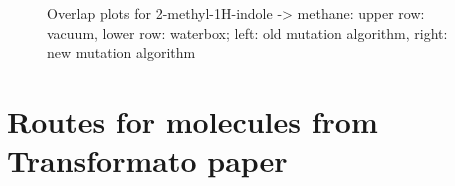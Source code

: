 \begin{figure}[h]
	\hfil
	
	\caption{Overlap plots for 2-methyl-1H-indole -> methane: upper row: vacuum, lower row: waterbox; left: old mutation algorithm, right: new mutation algorithm}
	\label{fig:methylindole_overlaps}
\end{figure}


\section{Routes for molecules from Transformato paper}

